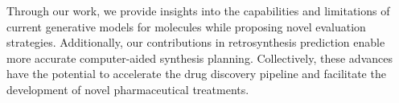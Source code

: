 {Through our work, we provide insights into the capabilities and limitations of
current generative models for molecules while proposing novel evaluation
strategies. Additionally, our contributions in retrosynthesis prediction enable
more accurate computer-aided synthesis planning. Collectively, these advances
have the potential to accelerate the drug discovery pipeline and facilitate the
development of novel pharmaceutical treatments.
}